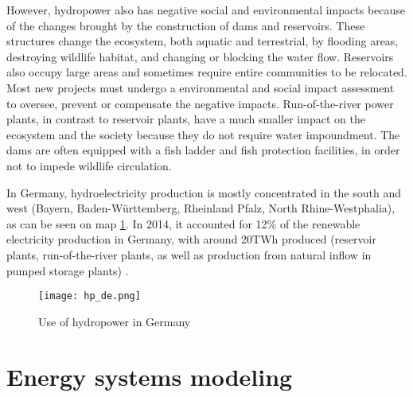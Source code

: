 However, hydropower also has negative social and environmental impacts because of the changes brought by the construction of dams and reservoirs. These structures change the ecosystem, both aquatic and terrestrial, by flooding areas, destroying wildlife habitat, and changing or blocking the water flow. Reservoirs also occupy large areas and sometimes require entire communities to be relocated. Most new projects must undergo a environmental and social impact assessment to oversee, prevent or compensate the negative impacts. Run-of-the-river power plants, in contrast to reservoir plants, have a much smaller impact on the ecosystem and the society because they do not require water impoundment. The dams are often equipped with a fish ladder and fish protection facilities, in order not to impede wildlife circulation.

In Germany, hydroelectricity production is mostly concentrated in the south and west (Bayern, Baden-Württemberg, Rheinland Pfalz, North Rhine-Westphalia), as can be seen on map \ref{hp_de}. In 2014, it accounted for 12\% of the renewable electricity production in Germany, with around 20TWh produced (reservoir plants, run-of-the-river plants, as well as production from natural inflow in pumped storage plants) \cite{bdew}.

\begin{figure}[H]
\centering
\texttt{[image: hp\_de.png]}
\caption[Use of hydropower in Germany]{Use of hydropower in Germany \cite{bdew}}
\label{hp_de}
\end{figure}


\section{Energy systems modeling}

